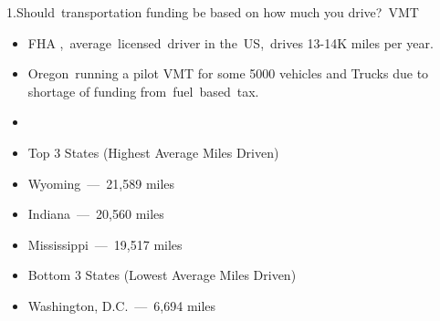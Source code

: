 
1.Should transportation funding be based on how much you drive? VMT 


\begin{itemize}
\item FHA , average licensed driver in the US, drives 13-14K miles per year.  


\end{itemize}

\begin{itemize}
\item Oregon running a pilot VMT for some 5000 vehicles and Trucks due to shortage of funding from fuel based tax.  


\end{itemize}

\begin{itemize}
\item  


\end{itemize}

\begin{itemize}
\item Top 3 States (Highest Average Miles Driven) 


\end{itemize}

\begin{itemize}
\item Wyoming — 21,589 miles 


\end{itemize}

\begin{itemize}
\item Indiana — 20,560 miles 


\end{itemize}

\begin{itemize}
\item Mississippi — 19,517 miles 


\end{itemize}

\begin{itemize}
\item Bottom 3 States (Lowest Average Miles Driven) 


\end{itemize}

\begin{itemize}
\item Washington, D.C. — 6,694 miles 


\end{itemize}

